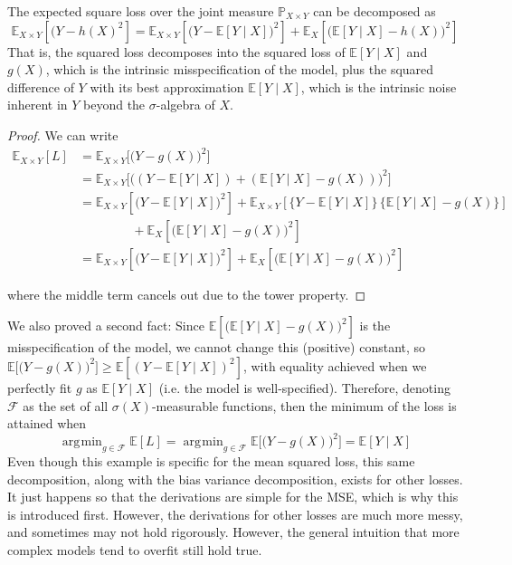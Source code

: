 \documentclass{article}
\DeclareMathOperator*{\argmin}{\arg\!\min}
\begin{document}
    \begin{theorem}
      The expected square loss over the joint measure $\mathbb{P}_{X \times Y}$ can be decomposed as 
      \begin{equation}
        \mathbb{E}_{X \times Y} [( Y - h(X)^2] = \mathbb{E}_{X \times Y} [\big(Y - \mathbb{E}[Y \mid X]\big)^2] + \mathbb{E}_X [\big(\mathbb{E}[Y \mid X] - h(X) \big)^2]
      \end{equation}
      That is, the squared loss decomposes into the squared loss of $\mathbb{E}[Y \mid X]$ and $g(X)$, which is the intrinsic misspecification of the model, plus the squared difference of $Y$ with its best approximation $\mathbb{E}[Y\mid X]$, which is the intrinsic noise inherent in $Y$ beyond the $\sigma$-algebra of $X$. 
    \end{theorem}
    \begin{proof}
      We can write 
      \begin{align*}
        \mathbb{E}_{X \times Y} [L] & = \mathbb{E}_{X \times Y} \big[ \big(Y - g(X)\big)^2 \big] \\
        & = \mathbb{E}_{X \times Y}\big[ \big((Y - \mathbb{E}[Y \mid X]) + (\mathbb{E}[Y \mid X] - g(X)) \big)^2 \big] \\
        & = \mathbb{E}_{X \times Y} [\big(Y - \mathbb{E}[Y \mid X]\big)^2] + \mathbb{E}_{X \times Y} [\{Y - \mathbb{E} [Y \mid X]\} \, \{ \mathbb{E}[Y \mid X] - g(X) \}] \\
        & \;\;\;\;\;\;\;\;\;\;\;\;\;\;\; + \mathbb{E}_X [\big(\mathbb{E}[Y \mid X] - g(X) \big)^2] \\
        & = \mathbb{E}_{X \times Y} [\big(Y - \mathbb{E}[Y \mid X]\big)^2] + \mathbb{E}_X [\big(\mathbb{E}[Y \mid X] - g(X) \big)^2]
      \end{align*}

      where the middle term cancels out due to the tower property. 
    \end{proof}

    We also proved a second fact: Since $\mathbb{E}[\big(\mathbb{E}[Y \mid X] - g(X) \big)^2]$ is the misspecification of the model, we cannot change this (positive) constant, so $\mathbb{E}\big[ \big(Y - g(X)\big)^2 \big] \geq \mathbb{E}[(Y - \mathbb{E}[Y \mid X])^2]$, with equality achieved when we perfectly fit $g$ as $\mathbb{E}[Y \mid X]$ (i.e. the model is well-specified). Therefore, denoting $\mathcal{F}$ as the set of all $\sigma(X)$-measurable functions, then the minimum of the loss is attained when 
    \begin{equation}
      \argmin_{g \in \mathcal{F}} \mathbb{E}[L] = \argmin_{g \in \mathcal{F}} \mathbb{E} \big[ \big(Y - g(X)\big)^2 \big] = \mathbb{E}[Y \mid X]
    \end{equation}
    Even though this example is specific for the mean squared loss, this same decomposition, along with the bias variance decomposition, exists for other losses. It just happens so that the derivations are simple for the MSE, which is why this is introduced first. However, the derivations for other losses are much more messy, and sometimes may not hold rigorously. However, the general intuition that more complex models tend to overfit still hold true. 
\end{document}
